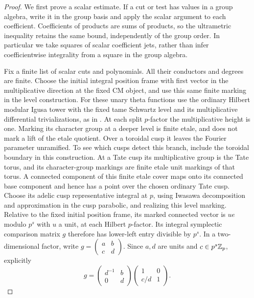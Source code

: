 \begin{proof}
We first prove a scalar estimate.  If a cut or test has values in
a group algebra, write it in the group basis and apply the scalar
argument to each coefficient.  Coefficients of products are sums
of products, so the ultrametric inequality retains the same bound,
independently of the group order.  In particular we take squares
of scalar coefficient jets, rather than infer coefficientwise
integrality from a square in the group algebra.

Fix a finite list of scalar cuts and polynomials.  All their
conductors and degrees are finite.  Choose the initial integral
position frame with first vector in the multiplicative direction
at the fixed CM object, and use this same finite marking in the
level construction.  For these unary theta
functions use the ordinary Hilbert modular Igusa tower with the
fixed tame Schwartz level and its multiplicative differential
trivializations, as in \cite[Lemma 4.4]{C}.  At each split $p$-factor
the multiplicative height is one.  Marking its character group at
a deeper level is finite etale, and does not mark a lift of the
etale quotient.  Over a toroidal cusp it leaves the Fourier
parameter unramified.  To see which cusps detect this branch,
include the toroidal boundary in this construction.  At a Tate
cusp its multiplicative group is the Tate torus, and its
character-group markings are finite etale unit markings of that
torus.  A connected component of this finite etale cover maps onto
its connected base component and hence has a point over the chosen
ordinary Tate cusp.  Choose its adelic cusp representative integral
at $p$, using Iwasawa decomposition and approximation in the cusp
parabolic, and realizing this level marking.  Relative to the
fixed initial position frame, its marked connected vector is
$ue$ modulo $p^s$ with $u$ a unit, at each Hilbert $p$-factor.
Its integral symplectic comparison matrix $g$ therefore has
lower-left entry divisible by $p^s$.  In a two-dimensional factor,
write $g=\left(\begin{smallmatrix}a&b\\c&d\end{smallmatrix}\right)$.
Since $a,d$ are units and $c\in p^s\mathbb Z_p$, explicitly
\[
 g=
 \begin{pmatrix}d^{-1}&b\\0&d\end{pmatrix}
 \begin{pmatrix}1&0\\c/d&1\end{pmatrix}.
\]
\end{proof}
